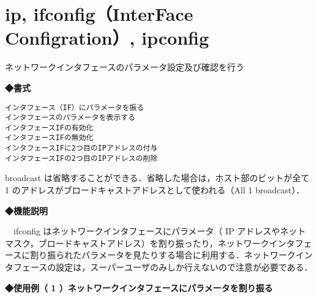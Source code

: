 \label{cmd:ifconfig}
\section{ip, ifconfig（InterFace Configration）, ipconfig}
ネットワークインタフェースのパラメータ設定及び確認を行う\par

{\bf ◆書式}

\begin{center}
\begin{screen}
\begin{alltt}
 インタフェース（IF）にパラメータを振る
 % ifconfig IF名 [inet IPアドレス] [netmask ネットマスク] [broadcast ブロードキャストアドレス]
 インタフェースのパラメータを表示する
 % ifconfig -a
 % ip address (ip a と省略可)
 インタフェース IF の有効化
 % ifconfig IF名 up
 インタフェース IF の無効化
 % ifconfig IF名 down
 インタフェース IF に2つ目の IP アドレスの付与
 % ifconfig IF名 alias IP アドレス netmask ネットマスク
 インタフェース IF の2つ目の IP アドレスの削除
 % ifconfig IF名 -alias IP アドレス netmask ネットマスク
\end{alltt}
\end{screen}
\end{center}

broadcast は省略することができる．省略した場合は，ホスト部のビットが全て
1 のアドレスがブロードキャストアドレスとして使われる（All 1 broadcast）．

{\bf ◆機能説明}

　ifconfig はネットワークインタフェースにパラメータ（ IP アドレスやネットマスク，ブロードキャストアドレス）を割り振ったり，ネットワークインタフェースに割り振られたパラメータを見たりする場合に利用する．ネットワークインタフェースの設定は，スーパーユーザのみしか行えないので注意が必要である．\par

{\bf ◆使用例（ 1 ）ネットワークインタフェースにパラメータを割り振る}
\begin{center}
\begin{breakbox}
\begin{alltt}
 % \underline{ifconfig bge0 inet 192.168.0.151 netmask 255.255.255.0 up}  \keybox{Enter}
 % ここでは，IPアドレス割り当てと同時にインターフェースの有効化を行って
 % いる．
\end{alltt}
\end{breakbox}
\end{center}

